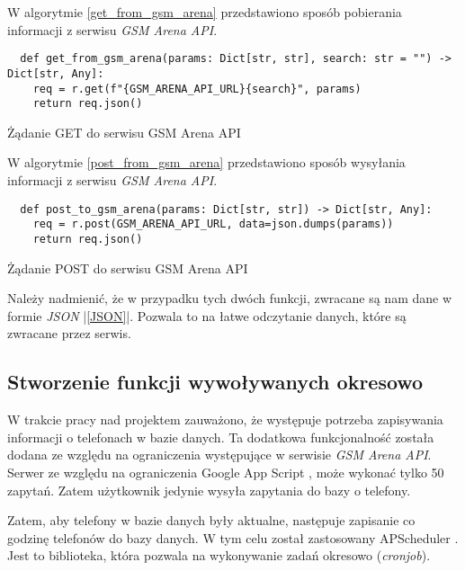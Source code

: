W algorytmie \ref{get_from_gsm_arena} przedstawiono sposób pobierania informacji z serwisu \textit{GSM Arena API}.

\begin{code}[H]
  \begin{verbatim}
  def get_from_gsm_arena(params: Dict[str, str], search: str = "") -> Dict[str, Any]:
    req = r.get(f"{GSM_ARENA_API_URL}{search}", params)
    return req.json()
  \end{verbatim}
  \caption{Żądanie GET do serwisu GSM Arena API}
  \label{get_from_gsm_arena}
\end{code}

W algorytmie \ref{post_from_gsm_arena} przedstawiono sposób wysyłania informacji z serwisu \textit{GSM Arena API}.
\begin{code}[H]
  \begin{verbatim}
  def post_to_gsm_arena(params: Dict[str, str]) -> Dict[str, Any]:
    req = r.post(GSM_ARENA_API_URL, data=json.dumps(params))
    return req.json()
  \end{verbatim}
  \caption{Żądanie POST do serwisu GSM Arena API}
  \label{post_from_gsm_arena}
\end{code}

Należy nadmienić, że w przypadku tych dwóch funkcji, zwracane są nam dane w formie \textit{JSON} |\ref{JSON}|. Pozwala to na łatwe odczytanie danych, które są zwracane przez serwis.

\subsection{Stworzenie funkcji wywoływanych okresowo}
W trakcie pracy nad projektem zauważono, że występuje potrzeba zapisywania informacji o telefonach w bazie danych. Ta dodatkowa funkcjonalność została dodana ze względu na ograniczenia występujące w serwisie \textit{GSM Arena API}. Serwer ze względu na ograniczenia Google App Script \cite{google_app_script}, może wykonać tylko 50 zapytań. Zatem użytkownik jedynie wysyła zapytania do bazy o telefony.

Zatem, aby telefony w bazie danych były aktualne, następuje zapisanie co godzinę telefonów do bazy danych. W tym celu został zastosowany APScheduler \cite{flask_apscheduler}. Jest to biblioteka, która pozwala na wykonywanie zadań okresowo (\textit{cronjob}).

